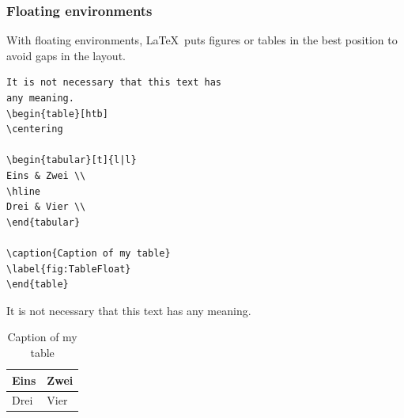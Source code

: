 \begin{frame}[fragile]
\frametitle{Floating environments}

With floating environments, \LaTeX\ puts figures or tables in the best position to avoid gaps in the layout. 


\begin{multicols}{2}

{\small
\begin{lstlisting}
It is not necessary that this text has 
any meaning.
\begin{table}[htb]
\centering

\begin{tabular}[t]{l|l}
Eins & Zwei \\
\hline
Drei & Vier \\
\end{tabular}

\caption{Caption of my table}
\label{fig:TableFloat}
\end{table}
\end{lstlisting}
}

\columnbreak

It is not necessary that this text has any meaning.
\begin{table}[htb]
	\centering
	
	\begin{tabular}[t]{l|l}
		Eins & Zwei \\
		\hline
		Drei & Vier \\
	\end{tabular}
	
	\caption{Caption of my table}
	\label{fig:TableFloat}
\end{table}

\end{multicols}

\end{frame}


